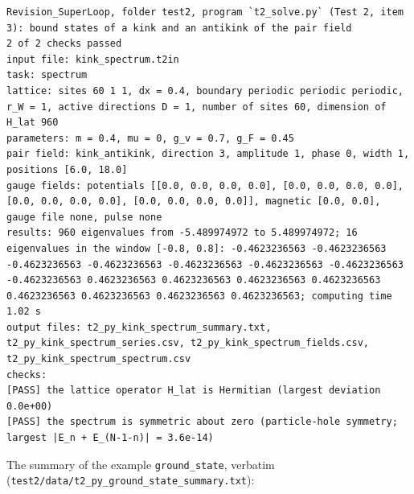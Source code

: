 \documentclass[
  10pt,
]{article}
\begin{document}
\begin{verbatim}
Revision_SuperLoop, folder test2, program `t2_solve.py` (Test 2, item 3): bound states of a kink and an antikink of the pair field
2 of 2 checks passed
input file: kink_spectrum.t2in
task: spectrum
lattice: sites 60 1 1, dx = 0.4, boundary periodic periodic periodic, r_W = 1, active directions D = 1, number of sites 60, dimension of H_lat 960
parameters: m = 0.4, mu = 0, g_v = 0.7, g_F = 0.45
pair field: kink_antikink, direction 3, amplitude 1, phase 0, width 1, positions [6.0, 18.0]
gauge fields: potentials [[0.0, 0.0, 0.0, 0.0], [0.0, 0.0, 0.0, 0.0], [0.0, 0.0, 0.0, 0.0], [0.0, 0.0, 0.0, 0.0]], magnetic [0.0, 0.0], gauge file none, pulse none
results: 960 eigenvalues from -5.489974972 to 5.489974972; 16 eigenvalues in the window [-0.8, 0.8]: -0.4623236563 -0.4623236563 -0.4623236563 -0.4623236563 -0.4623236563 -0.4623236563 -0.4623236563 -0.4623236563 0.4623236563 0.4623236563 0.4623236563 0.4623236563 0.4623236563 0.4623236563 0.4623236563 0.4623236563; computing time 1.02 s
output files: t2_py_kink_spectrum_summary.txt, t2_py_kink_spectrum_series.csv, t2_py_kink_spectrum_fields.csv, t2_py_kink_spectrum_spectrum.csv
checks:
[PASS] the lattice operator H_lat is Hermitian (largest deviation 0.0e+00)
[PASS] the spectrum is symmetric about zero (particle-hole symmetry; largest |E_n + E_(N-1-n)| = 3.6e-14)
\end{verbatim}

The summary of the example \texttt{ground\_state}, verbatim
(\texttt{test2/data/t2\_py\_ground\_state\_summary.txt}):
\end{document}
